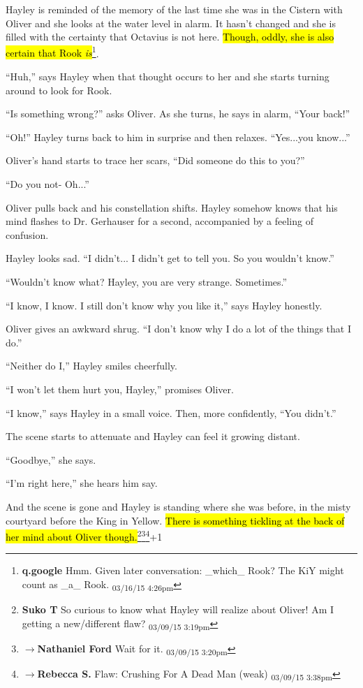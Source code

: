 Hayley is reminded of the memory of the last time she was in the Cistern with Oliver and she looks at the water level in alarm.  It hasn't changed and she is filled with the certainty that Octavius is not here.  \hl{Though, oddly, she is also certain that Rook \textit{is}}\footnote{\textbf{q.google }Hmm.  Given later conversation: \_which\_ Rook?  The KiY might count as \_a\_ Rook. \textsubscript{03/16/15 4:26pm}}.

``Huh,'' says Hayley when that thought occurs to her and she starts turning around to look for Rook.

``Is something wrong?'' asks Oliver.  As she turns, he says in alarm, ``Your back!''

``Oh!'' Hayley turns back to him in surprise and then relaxes.  ``Yes...you know...''

Oliver's hand starts to trace her scars, ``Did someone do this to you?''

``Do you not- Oh...''

Oliver pulls back and his constellation shifts.  Hayley somehow knows that his mind flashes to Dr. Gerhauser for a second, accompanied by a feeling of confusion.

Hayley looks sad.  ``I didn't... I didn't get to tell you.  So you wouldn't know.''

``Wouldn't know what?  Hayley, you are very strange.  Sometimes.''

``I know, I know.  I still don't know why you like it,'' says Hayley honestly.

Oliver gives an awkward shrug.  ``I don't know why I do a lot of the things that I do.''

``Neither do I,'' Hayley smiles cheerfully.

``I won't let them hurt you, Hayley,'' promises Oliver.

``I know,'' says Hayley in a small voice.  Then, more confidently, ``You didn't.''

The scene starts to attenuate and Hayley can feel it growing distant.

``Goodbye,'' she says.

``I'm right here,'' she hears him say.



And the scene is gone and Hayley is standing where she was before, in the misty courtyard before the King in Yellow.  \hl{There is something tickling at the back of her mind about Oliver though.}\footnote{\textbf{Suko T }So curious to know what Hayley will realize about Oliver!  Am I getting a new/different flaw? \textsubscript{03/09/15 3:19pm}}\footnote{$\rightarrow$\textbf{Nathaniel Ford }Wait for it. \textsubscript{03/09/15 3:20pm}}\footnote{$\rightarrow$\textbf{Rebecca S. }Flaw: Crushing For A Dead Man (weak) \textsubscript{03/09/15 3:38pm}}+1



